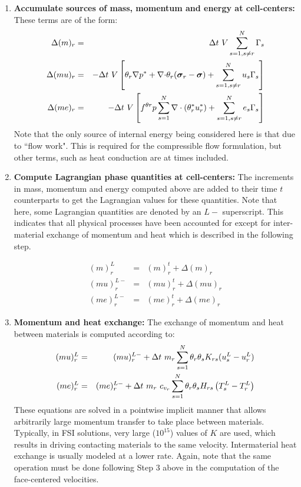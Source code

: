 \begin{enumerate}
\item {\bf Accumulate sources of mass, momentum and energy at cell-centers:}
These terms are of the form:
\begin{eqnarray}
 \Delta(m)_r &=& \Delta t~ V \sum\limits_{s=1, s\ne r}^N \Gamma_s 
   \label{deltamass}\\
 \Delta(mu)_r &=& -\Delta t~ V \left[\theta_r\nabla{ p^*} 
 + \nabla{ \cdot \theta_r (\ensuremath{\boldsymbol{\sigma}}_r - \ensuremath{\boldsymbol{\sigma}}) }
 + \sum_{s=1, s\ne r}^N u_s \Gamma_s\right] \label{deltamom} \\
 \Delta(me)_r &=&  -\Delta t~ V \left[f^{\theta r} p
     \sum\limits_{s=1}^N \nabla \cdot (\theta^{*}_r {u}^{*}_r)
 + \sum\limits_{s=1, s\ne r}^N e_s \Gamma_s \right] \label{deltenergy}
 \end{eqnarray}
Note that the only source of internal energy
being considered here is that due to ``flow work".  This is required 
for the compressible flow formulation, but other terms, such as heat 
conduction are at times included.

\item {\bf Compute Lagrangian phase quantities at cell-centers:} The
increments in mass, momentum and energy computed above are added
to their time $t$ counterparts to get the Lagrangian values for these 
quantities.
Note that here, some Lagrangian quantities are denoted by an $L-$ superscript.
This indicates that all physical processes have been accounted for except for
inter-material exchange of momentum and heat which is described in the following step.

 \begin{eqnarray}
 (m)_r^L &=& (m)_r^t + \Delta(m)_r \label{lagmass} \\
 (m u)_r^{L-} &=& (mu)_r^t + \Delta(mu)_r \label{lagmom} \\
 (m e)_r^{L-} &=& (m e)_r^t + \Delta(m e)_r \label{lagenergy}
\end{eqnarray}

\item {\bf Momentum and heat exchange:} The exchange of momentum and heat 
between materials is computed according to:
\begin{eqnarray}
(m u)_r^L &=& (m u)_r^{L-} +
  \Delta t~ m_r 
  \sum\limits_{s=1}^N \theta_r\theta_s K_{rs}(u_s^L - u_r^L) 
  \label{eqmomex} \\
(m e)_r^L &=& (m e)_r^{L-}+ 
  \Delta t~m_r~ c_{v_r} 
  \sum\limits_{s=1}^N \theta_r 
     \theta_s H_{rs}\left(T_s^L - T_r^L \right) \label{eqheatex}
\end{eqnarray}
These equations are solved in a pointwise implicit manner that allows 
arbitrarily large momentum transfer to take place between materials.  Typically,
in FSI solutions, very large ($10^{15}$) values of $K$ are used, which results
in driving contacting materials to the same velocity.  Intermaterial heat
exchange is usually modeled at a lower rate.  Again, note that the same 
operation must be done following Step 3 above in the computation of the 
face-centered velocities.


\end{enumerate}
